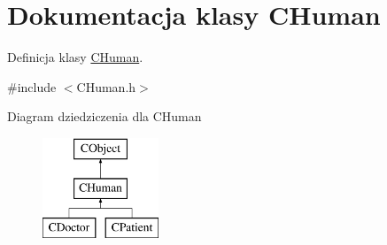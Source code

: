 \hypertarget{class_c_human}{}\section{Dokumentacja klasy C\+Human}
\label{class_c_human}


Definicja klasy \mbox{\hyperlink{class_c_human}{C\+Human}}.  




{\ttfamily \#include $<$C\+Human.\+h$>$}

Diagram dziedziczenia dla C\+Human\begin{figure}[H]
\begin{center}
\leavevmode
\includegraphics[height=3.000000cm]{class_c_human}
\end{center}
\end{figure}
